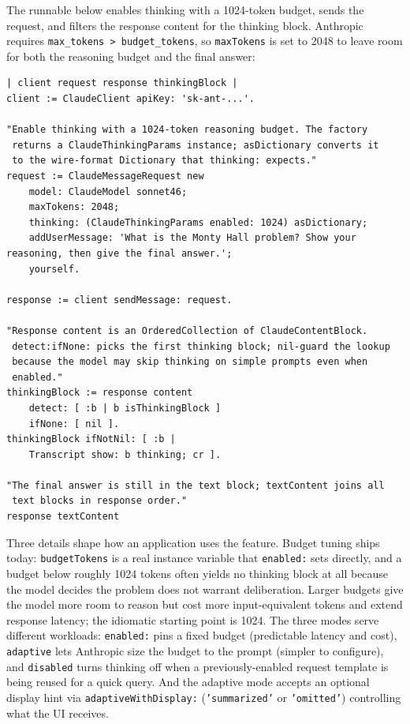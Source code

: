 \documentclass[a4paper,10pt,fleqn]{article}
\begin{document}
The runnable below enables thinking with a 1024-token budget, sends
the request, and filters the response content for the thinking
block.  Anthropic requires \texttt{max\_tokens > budget\_tokens}, so
\texttt{maxTokens} is set to 2048 to leave room for both the
reasoning budget and the final answer:

\begin{lstlisting}[language={}]
| client request response thinkingBlock |
client := ClaudeClient apiKey: 'sk-ant-...'.

"Enable thinking with a 1024-token reasoning budget. The factory
 returns a ClaudeThinkingParams instance; asDictionary converts it
 to the wire-format Dictionary that thinking: expects."
request := ClaudeMessageRequest new
    model: ClaudeModel sonnet46;
    maxTokens: 2048;
    thinking: (ClaudeThinkingParams enabled: 1024) asDictionary;
    addUserMessage: 'What is the Monty Hall problem? Show your reasoning, then give the final answer.';
    yourself.

response := client sendMessage: request.

"Response content is an OrderedCollection of ClaudeContentBlock.
 detect:ifNone: picks the first thinking block; nil-guard the lookup
 because the model may skip thinking on simple prompts even when
 enabled."
thinkingBlock := response content
    detect: [ :b | b isThinkingBlock ]
    ifNone: [ nil ].
thinkingBlock ifNotNil: [ :b |
    Transcript show: b thinking; cr ].

"The final answer is still in the text block; textContent joins all
 text blocks in response order."
response textContent
\end{lstlisting}

Three details shape how an application uses the feature.  Budget
tuning ships today: \texttt{budgetTokens} is a real instance
variable that \texttt{enabled:} sets directly, and a budget below
roughly 1024 tokens often yields no thinking block at all because
the model decides the problem does not warrant deliberation.  Larger
budgets give the model more room to reason but cost more
input-equivalent tokens and extend response latency; the idiomatic
starting point is 1024.  The three modes serve different workloads:
\texttt{enabled:} pins a fixed budget (predictable latency and
cost), \texttt{adaptive} lets Anthropic size the budget to the
prompt (simpler to configure), and \texttt{disabled} turns thinking
off when a previously-enabled request template is being reused for a
quick query.  And the adaptive mode accepts an optional display hint
via \texttt{adaptiveWithDisplay:} (\texttt{'summarized'} or
\texttt{'omitted'}) controlling what the UI receives.
\end{document}
